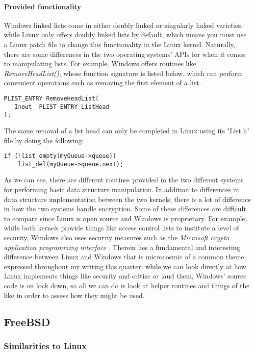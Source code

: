 \documentclass[letterpaper,10pt,titlepage]{article}
\begin{document}
\paragraph{Provided functionality}
Windows linked lists come in either doubly linked or singularly linked varieties, while Linux only offers doubly linked lists by default, which means you must use a Linux patch file to change this functionality in the Linux kernel. Naturally, there are some differences in the two operating systems' APIs for when it comes to manipulating lists. For example, Windows offers routines like \emph{RemoveHeadList()}, whose function signature is listed below, which can perform convenient operations such as removing the first element of a list. 
\begin{lstlisting}
PLIST_ENTRY RemoveHeadList(
  _Inout_ PLIST_ENTRY ListHead
);
\end{lstlisting}
The same removal of a list head can only be completed in Linux using its "List.h" file by doing the following:
\begin{lstlisting}
if (!list_empty(myQueue->queue))
    list_del(myQueue->queue.next);
\end{lstlisting}
As we can see, there are different routines provided in the two different systems for performing basic data structure manipulation. In addition to differences in data structure implementation between the two kernels, there is a lot of difference in how the two systems handle encryption. Some of these differences are difficult to compare since Linux is open source and Windows is proprietary. For example, while both kernels provide things like access control lists to institute a level of security, Windows also uses security measures such as the \emph{Microsoft crypto application programming interface} \cite{windowsSys}. Therein lies a fundamental and interesting difference between Linux and Windows that is microcosmic of a common theme expressed throughout my writing this quarter: while we can look directly at how Linux implements things like security and critize or laud them, Windows' source code is on lock down, so all we can do is look at helper routines and things of the like in order to assess how they might be used.  


\subsection{FreeBSD}

% 
%
%
\subsubsection{Similarities to Linux}
\end{document}
